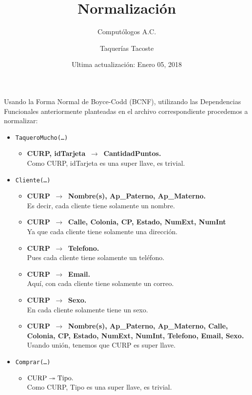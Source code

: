 \documentclass{article}
\title{Normalización}
\author{Computólogos A.C. \and Taquerías Tacoste}
\date{Ultima actualización: Enero 05, 2018}
\newcommand{\flecha}{$\,\to\,$ }
\begin{document}
\maketitle

Usando la Forma Normal de Boyce-Codd (BCNF), utilizando las Dependencias Funcionales anteriormente planteadas en el archivo correspondiente procedemos a normalizar:

\begin{itemize}

\item \texttt{TaqueroMucho(\ldots)}
	\begin{itemize}
		\item \textbf{CURP, idTarjeta \flecha CantidadPuntos.}\\
		Como CURP, idTarjeta es una super llave, es trivial.
	\end{itemize}

\item \texttt{Cliente(\ldots)}
	\begin{itemize}
		\item \textbf{CURP \flecha Nombre(s), Ap\_Paterno, Ap\_Materno.}\\
		Es decir, cada cliente tiene solamente un nombre.		
		\item \textbf{CURP \flecha Calle, Colonia, CP, Estado, NumExt, NumInt}\\
		Ya que cada cliente tiene solamente una dirección.
		\item \textbf{CURP \flecha Telefono.}\\
		Pues cada cliente tiene solamente un teléfono.
		\item \textbf{CURP \flecha Email.}\\
		Aquí, con cada cliente tiene solamente un correo.
		\item \textbf{CURP \flecha Sexo.}\\
		En cada cliente solamente tiene un sexo.
		\item \textbf{CURP \flecha Nombre(s), Ap\_Paterno, Ap\_Materno, Calle, Colonia, CP, Estado, NumExt, NumInt, Telefono, Email, Sexo.}\\
		Usando unión, tenemos que CURP es super llave.	
	\end{itemize}

\item \texttt{Comprar(\ldots)}
	\begin{itemize}
		\item \textbf{$\hbox{CURP} \twoheadrightarrow \hbox{Tipo.}$}\\
		Como CURP, Tipo es una super llave, es trivial.
	\end{itemize}


\end{itemize}
\end{document}
